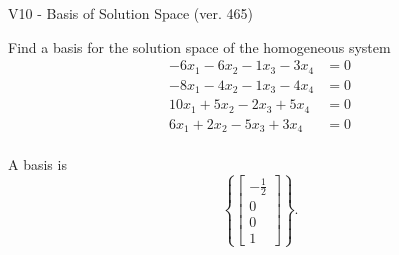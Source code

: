 \begin{exercise}
  \begin{exerciseTitle}V10 - Basis of Solution Space (ver. 465)\end{exerciseTitle}
  \begin{exerciseStatement}
    Find a basis for the solution space of the homogeneous system 
\begin{align*}
 -6 x_ 1 -6 x_ 2 -1 x_ 3 -3 x_ 4 &= 0  \\ 
  -8 x_ 1 -4 x_ 2 -1 x_ 3 -4 x_ 4 &= 0  \\ 
  10 x_ 1 + 5 x_ 2 -2 x_ 3 + 5 x_ 4 &= 0  \\ 
  6 x_ 1 + 2 x_ 2 -5 x_ 3 + 3 x_ 4 &= 0  \\ 
 \end{align*}


 
  \end{exerciseStatement}

  \begin{exerciseAnswer}
   A basis is   
\[\left\{\left[\begin{array}{c}
-\frac{1}{2} \\
0 \\
0 \\
1
\end{array}\right]\right\}.\]

  


  \end{exerciseAnswer}
\end{exercise}